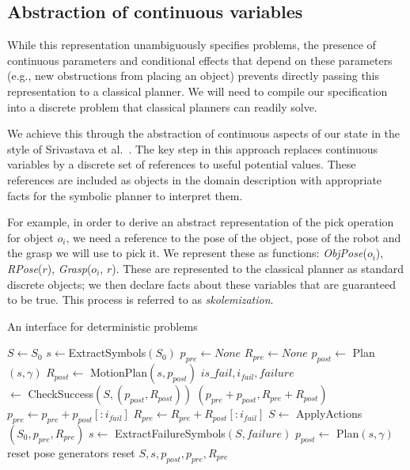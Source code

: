 \subsection{Abstraction of continuous variables}
While this representation unambiguously specifies problems, the
presence of continuous parameters and conditional effects that depend
on these parameters (e.g., new obstructions from placing an object)
prevents directly passing this representation to a classical
planner. We will need to compile our specification into a discrete
problem that classical planners can readily solve.

We achieve this through the abstraction of continuous aspects of our
state in the style of Srivastava et
al.~\cite{srivastava2014combined}. The key step in this approach
replaces continuous variables by a discrete set of references to useful
potential values. These references are included as objects in
the domain description with appropriate facts for the symbolic planner
to interpret them.

For example, in order to derive an abstract representation of the pick
operation for object $o_i$, we need a reference to the pose of the
object, pose of the robot and the grasp we will use to pick it. We represent these as
functions: \emph{ObjPose}($o_i$), \emph{RPose}($r$), \emph{Grasp}($o_i$, $r$). These are represented to the
classical planner as standard discrete objects; we then declare facts
about these variables that are guaranteed to be true. This process is
referred to as \emph{skolemization}.

\begin{algorithm}
 \caption{An interface for deterministic problems} \label{alg-ifop}
 \begin{algorithmic}[1]
  \State $S \leftarrow S_0$
  \State $s \leftarrow $ExtractSymbols$(S_0)$
  \State $p_{pre} \leftarrow None$
  \State $R_{pre} \leftarrow None$
  \State $p_{post} \leftarrow $ Plan$(s, \gamma)$
     \State $R_{post} \leftarrow $ MotionPlan$(s, p_{post})$
     \State $is\_fail, i_{fail}, failure$\\\hspace{50pt}$ \leftarrow $ CheckSuccess$(S, (p_{post}, R_{post}))$
         \State \Return $(p_{pre} + p_{post}, R_{pre} + R_{post})$
     \EndIf
     \State $p_{pre} \leftarrow p_{pre} + p_{post}[:i_{fail}]$
     \State $R_{pre} \leftarrow R_{pre} + R_{post}[:i_{fail}]$
     \State $S \leftarrow $ ApplyActions$(S_0, p_{pre}, R_{pre})$
     \State $s\leftarrow $ ExtractFailureSymbols$(S, failure)$
     \State $p_{post} \leftarrow $ Plan$(s, \gamma)$     
        \State reset pose generators
        \State reset $S, s, p_{post}, p_{pre}, R_{pre}$
     \EndIf
  \EndWhile
  \EndProcedure
 \end{algorithmic}
\end{algorithm}

